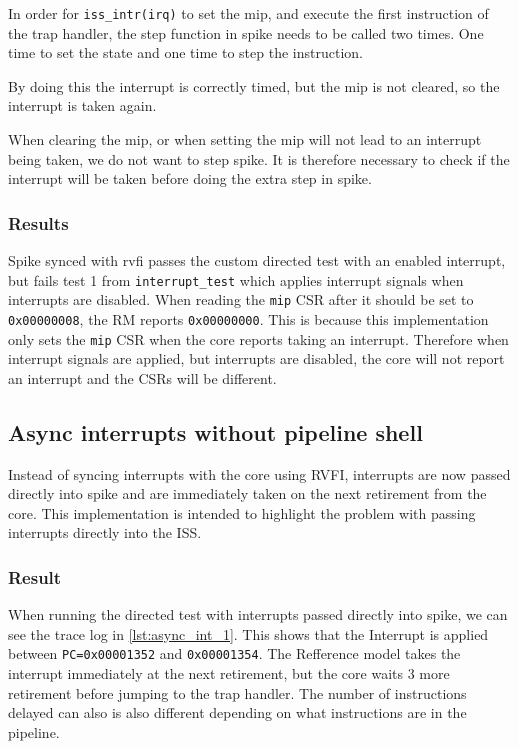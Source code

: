 In order for \lstinline{iss_intr(irq)} to set the mip, and execute the first instruction of the trap handler, the step function in spike needs to be called two times. One time to set the state and one time to step the instruction.

By doing this the interrupt is correctly timed, but the mip is not cleared, so the interrupt is taken again.

When clearing the mip, or when setting the mip will not lead to an interrupt being taken, we do not want to step spike. It is therefore necessary to check if the interrupt will be taken before doing the extra step in spike.

\subsubsection{Results}

Spike synced with rvfi passes the custom directed test with an enabled interrupt, but fails test 1 from \lstinline{interrupt_test} which applies interrupt signals when interrupts are disabled. When reading the \lstinline{mip} CSR after it should be set to \lstinline{0x00000008}, the RM reports \lstinline{0x00000000}. This is because this implementation only sets the \lstinline{mip} CSR when the core reports taking an interrupt. Therefore when interrupt signals are applied, but interrupts are disabled, the core will not report an interrupt and the CSRs will be different.


\subsection{Async interrupts without pipeline shell }

Instead of syncing interrupts with the core using RVFI, interrupts are now passed directly into spike and are immediately taken on the next retirement from the core. This implementation is intended to highlight the problem with passing interrupts directly into the ISS.

\subsubsection{Result}

When running the directed test with interrupts passed directly into spike, we can see the trace log in \cref{lst:async_int_1}. This shows that the Interrupt is applied between \lstinline{PC=0x00001352} and \lstinline{0x00001354}. The Refference model takes the interrupt immediately at the next retirement, but the core waits 3 more retirement before jumping to the trap handler. The number of instructions delayed can also is also different depending on what instructions are in the pipeline.

